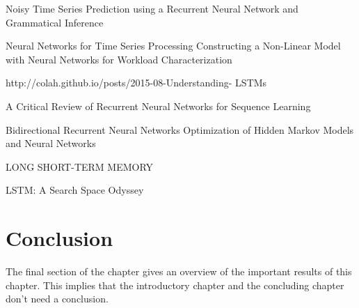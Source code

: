 Noisy Time Series Prediction using a Recurrent Neural
Network and Grammatical Inference

Neural Networks for Time Series Processing
Constructing a Non-Linear Model with Neural
Networks for Workload Characterization



http://colah.github.io/posts/2015-08-Understanding-
LSTMs

A Critical Review of Recurrent Neural Networks
for Sequence Learning

Bidirectional Recurrent Neural Networks
Optimization of Hidden Markov Models and Neural
Networks


LONG SHORT-TERM MEMORY

LSTM: A Search Space Odyssey

\section{Conclusion}
The final section of the chapter gives an overview of the important results
of this chapter. This implies that the introductory chapter and the
concluding chapter don't need a conclusion.



